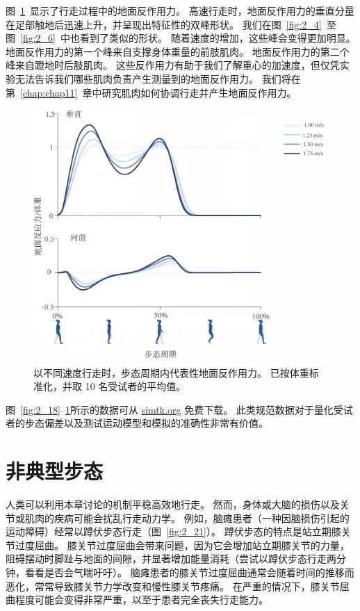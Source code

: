 图~\ref{fig:2_20}~显示了行走过程中的地面反作用力。
高速行走时，地面反作用力的垂直分量在足部触地后迅速上升，并呈现出特征性的双峰形状。
我们在图~\ref{fig:2_4}~至图~\ref{fig:2_6}~中也看到了类似的形状。
随着速度的增加，这些峰会变得更加明显。
地面反作用力的第一个峰来自支撑身体重量的前肢肌肉。
地面反作用力的第二个峰来自蹬地时后肢肌肉。
这些反作用力有助于我们了解重心的加速度，但仅凭实验无法告诉我们哪些肌肉负责产生测量到的地面反作用力。
我们将在第~\ref{chap:chap11}~章中研究肌肉如何协调行走并产生地面反作用力。


\begin{figure}[!htb]
	\centering
	\includegraphics[width=0.95\linewidth]{chap2/2_20}
	\caption{以不同速度行走时，步态周期内代表性地面反作用力。
		已按体重标准化，并取 10 名受试者的平均值\cite{arnold2013muscle}。 \label{fig:2_20}}
\end{figure}


图~\ref{fig:2_18}–\ref{fig:2_20}所示的数据可从 \href{simtk.org}{simtk.org} 免费下载。
此类规范数据对于量化受试者的步态偏差以及测试运动模型和模拟的准确性非常有价值。


\section{非典型步态}

人类可以利用本章讨论的机制平稳高效地行走。
然而，身体或大脑的损伤以及关节或肌肉的疾病可能会扰乱行走动力学。
例如，脑瘫患者（一种因脑损伤引起的运动障碍）经常以蹲伏步态行走（图~\ref{fig:2_21}）。
蹲伏步态的特点是站立期膝关节过度屈曲。
膝关节过度屈曲会带来问题，因为它会增加站立期膝关节的力量，阻碍摆动时脚趾与地面的间隙，并显著增加能量消耗（尝试以蹲伏步态行走两分钟，看看是否会气喘吁吁）。
脑瘫患者的膝关节过度屈曲通常会随着时间的推移而恶化，常常导致膝关节力学改变和慢性膝关节疼痛。
在严重的情况下，膝关节屈曲程度可能会变得非常严重，以至于患者完全丧失行走能力。


